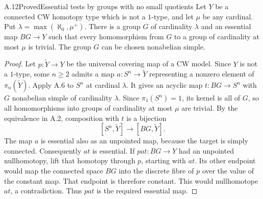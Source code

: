 \begin{claim}{A.12}{Proved}{Essential tests by groups with no small quotients}
Let $Y$ be a connected CW homotopy type which is not a $1$-type,
and let $\mu$ be any cardinal. Put
$\lambda=\max(\aleph_0,\mu^+)$. There is a group $G$ of
cardinality $\lambda$ and an essential map $BG\to Y$ such that
every homomorphism from $G$ to a group of cardinality at most
$\mu$ is trivial. The group $G$ can be chosen nonabelian simple.
\end{claim}
\begin{proof}
Let $p:\widetilde Y\to Y$ be the universal covering map of a CW
model. Since $Y$ is not a $1$-type, some $n\geq2$ admits a map
$a:S^n\to\widetilde Y$ representing a nonzero element of
$\pi_n(\widetilde Y)$. Apply A.6 to $S^n$ at cardinal $\lambda$.
It gives an acyclic map $t:BG\to S^n$ with $G$ nonabelian simple
of cardinality $\lambda$. Since $\pi_1(S^n)=1$, its kernel is
all of $G$, so all homomorphisms into groups of cardinality at
most $\mu$ are trivial. By the equivalence in A.2, composition
with $t$ is a bijection
\[
 [S^n,\widetilde Y]\longrightarrow[BG,\widetilde Y].
\]
The map $a$ is essential also as an unpointed map, because the
target is simply connected. Consequently $at$ is essential.
If $pat:BG\to Y$ had an unpointed nullhomotopy, lift that
homotopy through $p$, starting with $at$. Its other endpoint
would map the connected space $BG$ into the discrete fibre of
$p$ over the value of the constant map. That endpoint is
therefore constant. This would nullhomotope $at$, a
contradiction. Thus $pat$ is the required essential map.
\end{proof}


